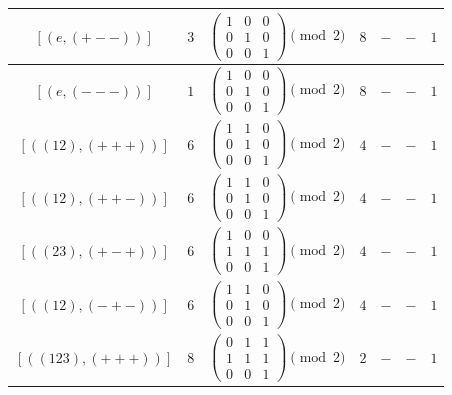 \documentclass[11pt,english]{amsart}
\numberwithin{equation}{section}
\numberwithin{figure}{section}
\theoremstyle{plain}
\theoremstyle{plain}
\theoremstyle{definition}
\theoremstyle{remark}
\begin{document}
\begin{itemize}
\begin{table}[H]
\begin{tabular}{|c|c|c|c|c|c|c|}
        $[ (e, (+--)) ]$ & $3$ & $\begin{pmatrix} 1 & 0 & 0 \\ 0 & 1 & 0 \\ 0 & 0 & 1 \end{pmatrix}\pmod 2$ & $8$ & $-$ & $-$ & $1$ \\\hline
        
        $[ (e, (---)) ]$ & $1$ & $\begin{pmatrix} 1 & 0 & 0 \\ 0 & 1 & 0 \\ 0 & 0 & 1 \end{pmatrix}\pmod 2$ & $8$ & $-$ & $-$ & $1$ \\\hline
        
        $[ ((12), (+++)) ]$ & $6$ & $\begin{pmatrix} 1 & 1 & 0 \\ 0 & 1 & 0 \\ 0 & 0 & 1 \end{pmatrix}\pmod 2$ & $4$ & $-$ & $-$ & $1$ \\\hline
        
        $[ ((12), (++-)) ]$ & $6$ & $\begin{pmatrix} 1 & 1 & 0 \\ 0 & 1 & 0 \\ 0 & 0 & 1 \end{pmatrix}\pmod 2$ & $4$ & $-$ & $-$ & $1$ \\\hline
        
        $[ ((23), (+-+)) ]$ & $6$ & $\begin{pmatrix} 1 & 0 & 0 \\ 1 & 1 & 1 \\ 0 & 0 & 1 \end{pmatrix}\pmod 2$ & $4$ & $-$ & $-$ & $1$ \\\hline
        
        $[ ((12), (-+-)) ]$ & $6$ & $\begin{pmatrix} 1 & 1 & 0 \\ 0 & 1 & 0 \\ 0 & 0 & 1 \end{pmatrix}\pmod 2$ & $4$ & $-$ & $-$ & $1$ \\\hline
        
        $[ ((123), (+++)) ]$ & $8$ & $\begin{pmatrix} 0 & 1 & 1 \\ 1 & 1 & 1 \\ 0 & 0 & 1 \end{pmatrix}\pmod 2$ & $2$ & $-$ & $-$ & $1$ \\\hline
        

\end{tabular}
\end{table}
\end{itemize}
\end{document}
